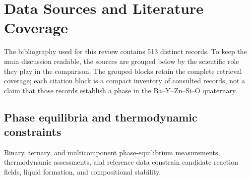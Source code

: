 \section*{Data Sources and Literature Coverage}
The bibliography used for this review contains 513 distinct records. To keep the main discussion readable, the sources are grouped below by the scientific role they play in the comparison. The grouped blocks retain the complete retrieval coverage; each citation block is a compact inventory of consulted records, not a claim that those records establish a phase in the Ba--Y--Zn--Si--O quaternary.

\subsection*{Phase equilibria and thermodynamic constraints}
Binary, ternary, and multicomponent phase-equilibrium measurements, thermodynamic assessments, and reference data constrain candidate reaction fields, liquid formation, and compositional stability.
\cite{kim2025key,lee2025coupled,makrovets2023y2o3,derensy2026phase,bryuzgina2022actual,ren2024influence,zaitseva2023phase,bryuzgina2023actualx,shevchenko2021integrated,zhang2021thermodynamic,shevchenko2020thermodynamic,shevchenko2020thermodynamicx,shevchenko2020experimental,jeon2025phase,dobrynenko2025solid,shevchenko2025experimental,abdeyazdan2024phase,liao2021phase,wen2023phase,abdeyazdan2023phase,bonner2024phase,jak2024phase,vieth2021tailoring,vieth2021tailoringx}
\cite{chen2026a,2025glass,jensen2026impact,chen2024navigating,lafontaine2020the,charpentier2022multicomponent,evans2021visualizing,wang2024optimal,arroyave2022phase,huang2025synthesis,omar2021phase,schroder2020combined,ali2023bioactive,smith2021experimental,nastar2021thermodynamic,pei2026coupled,doanthi2025structural,praveen2024pertinent,nuta2021gaseous,tsutsui2021a,mao2008thermodynamic,parker2019stability,pan2010thermodynamic,ye2017experimental}
\cite{liang1999enthalpy,wicks1963thermodynamic,sciti2026densification,mor2026influence,walters2022thermodynamic,gong2022calibrating,rana2021insights,yang2021thermodynamics,schlesinger2026thermodynamic,dhar2026thermodynamic,jang2025identification,fegley2023chemical,pitcher2024non,li2026effect,young2023thermodynamic,cosby2023thermodynamic,walters2026constructing,zhang2026interfacial,miller1964phase,jak2012integrated,xia2015experimental,mishra1996thermodynamic,hansson2004phase,jantzen1979phase}
\cite{zhao1999phase,khartcyzov2022experimental,nekhoroshev2024thermodynamic,wen2023phasex,khartcyzov2024analysis,shi2024phase,abdeyazdan2023experimental,poerschke2014stability,park2017single,dingwell1990relaxation,dingwell1990relaxationx,kelsey2014on,anon2022phase,hidayat2021distributions,rygalin2010the,waurischk2020crystal,smith1977cheminform,mason1976phase,erlebach2021phase,liu2013salt,kalita2023recent,cao2019modeling,sundman2018a,campbell2014the}
